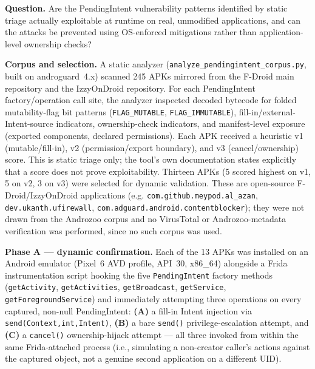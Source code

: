 \textbf{Question.} Are the PendingIntent vulnerability patterns identified by static
triage actually exploitable at runtime on real, unmodified applications, and can the
attacks be prevented using OS-enforced mitigations rather than application-level
ownership checks?

\textbf{Corpus and selection.} A static analyzer (\texttt{analyze\_pendingintent\_corpus.py},
built on androguard~4.x) scanned 245 APKs mirrored from the F-Droid main repository and
the IzzyOnDroid repository. For each PendingIntent factory/operation call site, the
analyzer inspected decoded bytecode for folded mutability-flag bit patterns
(\texttt{FLAG\_MUTABLE}, \texttt{FLAG\_IMMUTABLE}), fill-in/external-Intent-source
indicators, ownership-check indicators, and manifest-level exposure (exported
components, declared permissions). Each APK received a heuristic v1 (mutable/fill-in),
v2 (permission/export boundary), and v3 (cancel/ownership) score. This is static
triage only; the tool's own documentation states explicitly that a score does not
prove exploitability. Thirteen APKs (5 scored highest on v1, 5 on v2, 3 on v3) were
selected for dynamic validation. These are open-source F-Droid/IzzyOnDroid applications
(e.g. \texttt{com.github.meypod.al\_azan}, \texttt{dev.ukanth.ufirewall},
\texttt{com.adguard.android.contentblocker}); they were not drawn from the Androzoo
corpus and no VirusTotal or Androzoo-metadata verification was performed, since no such
corpus was used.

\textbf{Phase A — dynamic confirmation.} Each of the 13 APKs was installed on an
Android emulator (Pixel~6 AVD profile, API~30, x86\_64) alongside a Frida instrumentation
script hooking the five \texttt{PendingIntent} factory methods
(\texttt{getActivity}, \texttt{getActivities}, \texttt{getBroadcast}, \texttt{getService},
\texttt{getForegroundService}) and immediately attempting three operations on every
captured, non-null PendingIntent: \textbf{(A)} a fill-in Intent injection via
\texttt{send(Context,\allowbreak int,\allowbreak Intent)}, \textbf{(B)} a bare
\texttt{send()} privilege-escalation attempt, and \textbf{(C)} a \texttt{cancel()}
ownership-hijack attempt — all three invoked from within the same Frida-attached
process (i.e., simulating a non-creator caller's actions against the captured object,
not a genuine second application on a different UID).

